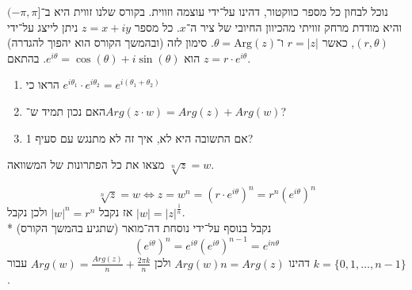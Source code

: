נוכל לבחון כל מספר כווקטור, דהינו על־ידי עוצמה וזווית.
בקורס שלנו זווית היא ב־$(-\pi, \pi]$ והיא מודדת מרחק זוויתי מהכיוון החיובי של ציר ה־$x$. %
כל מספר $z = x + i y$ ניתן לייצג על־ידי $(r, \theta)$, כאשר $r = |z|$ ו־$\theta = \text{Arg}(z)$.
סימון לזה (ובהמשך הקורס הוא יהפוך להגדרה) הוא $e^{i\theta} = \cos(\theta) + i \sin(\theta)$.
בהתאם $z = r \cdot e^{i\theta}$.
\begin{exercise}
	\begin{enumerate}
		\item הראו כי $e^{i \theta_1} \cdot e^{i \theta_2} = e^{i(\theta_1 + \theta_2)}$
		\item האם נכון תמיד ש־$Arg(z \cdot w) = Arg(z) + Arg(w)$?
		\item אם התשובה היא לא, איך זה לא מתנגש עם סעיף 1?
	\end{enumerate}
\end{exercise}
\begin{exercise}
	מצאו את כל הפתרונות של המשוואה $\sqrt[n]{z} = w$.
\end{exercise}
\begin{solution}
	\[
		\sqrt[n]{z} = w \iff z = w^n = {(r \cdot e^{i\theta})}^n = r^n {(e^{i\theta})}^n
	\]
	אז נקבל ${|w|}^n = r^n$ ולכן נקבל $|w| = {|z|}^\frac{1}{n}$. \\*
	נקבל בנוסף על־ידי נוסחת דה־מואר (שתגיע בהמשך הקורס)
	\[
		{(e^{i\theta})}^n = e^{i\theta} {(e^{i\theta})}^{n - 1} = e^{i n\theta}
	\]
	דהינו $Arg(w) n = Arg(z)$ ולכן $Arg(w) = \frac{Arg(z)}{n} + \frac{2\pi k}{n}$ עבור $k = \{0, 1, \dots, n - 1\}$.
\end{solution}

